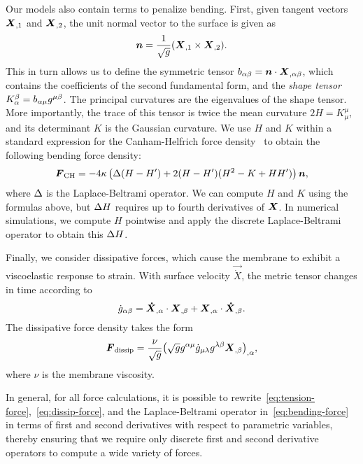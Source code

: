 Our models also contain terms to penalize bending. First, given tangent vectors $\boldsymbol{X}_{,1}$ and $\boldsymbol{X}_{,2}$, the unit normal vector to the surface is given as
\begin{equation}\label{eq:unit-normal}
\boldsymbol{n} = \frac{1}{\sqrt{g}} (\boldsymbol{X}_{,1}\times\boldsymbol{X}_{,2}).
\end{equation}
This in turn allows us to define the symmetric tensor $b_{\alpha\beta} = \boldsymbol{n}\cdot\boldsymbol{X}_{,\alpha\beta}$, which contains the coefficients of the second fundamental form, and the \emph{shape tensor} $K_\alpha^\beta = b_{\alpha\mu}g^{\mu\beta}$. The principal curvatures are the eigenvalues of the shape tensor. More importantly, the trace of this tensor is twice the mean curvature $2H = K_\mu^\mu$, and its determinant $K$ is the Gaussian curvature. We use $H$ and $K$ within a standard expression for the Canham-Helfrich force density~\cite{Zhongcan:1989ue} to obtain the following bending force density:
\begin{equation}\label{eq:bending-force}
\boldsymbol{F}_\text{CH} = -4\kappa\left(\Delta(H-H')+2(H-H')(H^2-K+HH')\right)\boldsymbol{n},
\end{equation}
where $\Delta$ is the Laplace-Beltrami operator. We can compute $H$ and $K$ using the
formulas above, but $\Delta H$ requires up to fourth derivatives of $\boldsymbol{X}$. In numerical simulations, we compute $H$ pointwise and apply the discrete
Laplace-Beltrami operator to obtain this $\Delta H$.

Finally, we consider dissipative forces, which cause the membrane to exhibit a
viscoelastic response to strain. With surface velocity $\vec{\dot{X}}$, the metric tensor
changes in time according to 
\begin{equation}
    \dot{g}_{\alpha\beta} = \boldsymbol{\dot{X}}_{,\alpha}\cdot\boldsymbol{X}_{,\beta} + \boldsymbol{X}_{,\alpha}\cdot\boldsymbol{\dot{X}}_{,\beta}.
\end{equation}
The dissipative force density takes the form~\cite{Rangamani:2012hi}
\begin{equation}\label{eq:dissip-force}
    \boldsymbol{F}_\text{dissip} = \frac{\nu}{\sqrt{g}}{\left(\sqrt{g}g^{\alpha\mu}\dot{g}_{\mu\lambda}g^{\lambda\beta}\boldsymbol{X}_{,\beta}\right)}_{,\alpha},
\end{equation}
where $\nu$ is the membrane viscosity. 

In general, for all force calculations, it is possible to rewrite~\eqref{eq:tension-force},~\eqref{eq:dissip-force}, and the Laplace-Beltrami
operator in~\eqref{eq:bending-force} in terms of first and second derivatives with
respect to parametric variables, thereby ensuring that we require only discrete first and second derivative operators to compute a wide variety of forces.

